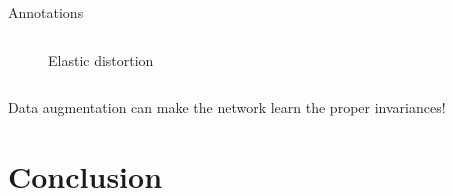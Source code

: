 \documentclass{beamer}
\begin{document}
\begin{frame}{Annotations}
\begin{columns}[T]
\begin{column}{.16\textwidth}
\begin{figure}[!ht]
\caption{Elastic distortion}
\label{fig: Elastic distortions}
\end{figure}
\end{column}%

\end{columns}

Data augmentation can make the network learn the proper invariances!
%

\end{frame}

\section{Conclusion}
\end{document}
